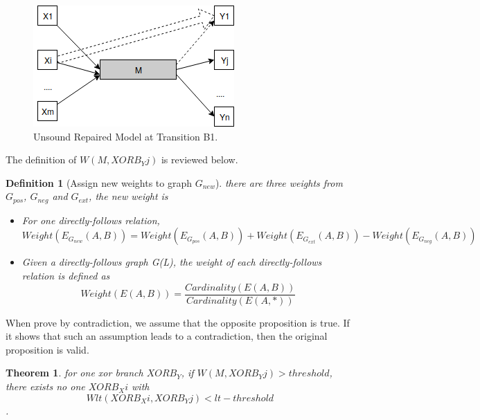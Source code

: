 \documentclass[]{article}
\newtheorem{mydef}{Definition}[section]
\newtheorem{mytheorem}{Theorem}[section]
\begin{document}
\begin{figure}[!h]
	\includegraphics[width=\textwidth]{RelationOfThreshold-LTThreshold.png}
	\caption{Unsound Repaired Model at Transition B1.}
	\label{fig:simplified-graph-model}
\end{figure}

The definition of $W(M, XORB_Yj)$ is reviewed below.
\begin{mydef}[Assign new weights to graph $G_{new}$]
	there are three weights from $G_{pos}$, $G_{neg}$ and $G_{ext}$, the new weight is 
	\begin{itemize}
		\item For one directly-follows relation, \[ Weight(E_{G_{new}}(A,B)) = Weight(E_{G_{pos}}(A,B)) + Weight(E_{G_{ext}}(A,B)) - Weight(E_{G_{neg}}(A,B))\]
		\item Given a directly-follows graph G(L), the weight of each directly-follows relation is defined as \[ Weight(E(A,B)) = \frac{Cardinality(E(A,B))}{Cardinality(E(A,*))}  \] 
	\end{itemize}
\end{mydef}

When prove by contradiction, we assume that the opposite proposition is true. If it shows that such an assumption leads to a contradiction, then the original proposition is valid. 
\begin{mytheorem}
	for one xor branch $XORB_Y$, if $W(M, XORB_Yj) > threshold$, \\ there exists no one $XORB_Xi$ with 
	\[Wlt(XORB_Xi, XORB_Yj)<lt-threshold\]. 
\end{mytheorem}
\end{document}
